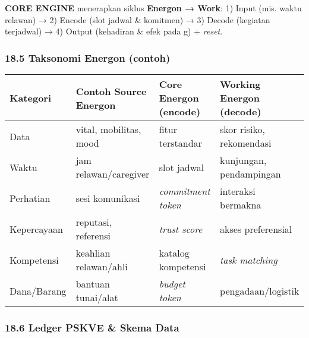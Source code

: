 \documentclass[
  letterpaper,
  DIV=11,
  numbers=noendperiod]{scrartcl}
\begin{document}
\textbf{CORE ENGINE} menerapkan siklus \textbf{Energon → Work}: 1) Input
(mis. waktu relawan) → 2) Encode (slot jadwal \& komitmen) → 3) Decode
(kegiatan terjadwal) → 4) Output (kehadiran \& efek pada
\textbar g\textbar) + \emph{reset}.

\subsubsection{18.5 Taksonomi Energon
(contoh)}\label{taksonomi-energon-contoh}

\begin{longtable}[]{@{}
  >{\raggedright\arraybackslash}p{}
  >{\raggedright\arraybackslash}p{}
  >{\raggedright\arraybackslash}p{}
  >{\raggedright\arraybackslash}p{}@{}}
\toprule\noalign{}
\begin{minipage}[b]{\linewidth}\raggedright
Kategori
\end{minipage} & \begin{minipage}[b]{\linewidth}\raggedright
Contoh Source Energon
\end{minipage} & \begin{minipage}[b]{\linewidth}\raggedright
Core Energon (encode)
\end{minipage} & \begin{minipage}[b]{\linewidth}\raggedright
Working Energon (decode)
\end{minipage} \\
\midrule\noalign{}
\endhead
\bottomrule\noalign{}
\endlastfoot
Data & vital, mobilitas, mood & fitur terstandar & skor risiko,
rekomendasi \\
Waktu & jam relawan/caregiver & slot jadwal & kunjungan, pendampingan \\
Perhatian & sesi komunikasi & \emph{commitment token} & interaksi
bermakna \\
Kepercayaan & reputasi, referensi & \emph{trust score} & akses
preferensial \\
Kompetensi & keahlian relawan/ahli & katalog kompetensi & \emph{task
matching} \\
Dana/Barang & bantuan tunai/alat & \emph{budget token} &
pengadaan/logistik \\
\end{longtable}

\subsubsection{18.6 Ledger PSKVE \& Skema
Data}\label{ledger-pskve-skema-data}
\end{document}
